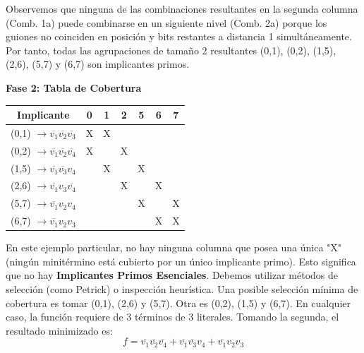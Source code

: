 Observemos que ninguna de las combinaciones resultantes en la segunda columna (Comb. 1a) puede combinarse en un siguiente nivel (Comb. 2a) porque los guiones no coinciden en posición y bits restantes a distancia 1 simultáneamente. Por tanto, todas las agrupaciones de tamaño 2 resultantes (0,1), (0,2), (1,5), (2,6), (5,7) y (6,7) son implicantes primos.

\textbf{Fase 2: Tabla de Cobertura}
\begin{center}
\begin{tabular}{|c|c|c|c|c|c|c|}
\hline
\textbf{Implicante} & \textbf{0} & \textbf{1} & \textbf{2} & \textbf{5} & \textbf{6} & \textbf{7} \\ \hline
(0,1) $\rightarrow \overline{v_1}\overline{v_2}\overline{v_3}$ & X & X & & & & \\ \hline
(0,2) $\rightarrow \overline{v_1}\overline{v_2}\overline{v_4}$ & X & & X & & & \\ \hline
(1,5) $\rightarrow \overline{v_1}\overline{v_3}v_4$ & & X & & X & & \\ \hline
(2,6) $\rightarrow \overline{v_1}v_3\overline{v_4}$ & & & X & & X & \\ \hline
(5,7) $\rightarrow \overline{v_1}v_2v_4$ & & & & X & & X \\ \hline
(6,7) $\rightarrow \overline{v_1}v_2v_3$ & & & & & X & X \\ \hline
\end{tabular}
\end{center}
En este ejemplo particular, no hay ninguna columna que posea una única "X" (ningún minitérmino está cubierto por un único implicante primo). Esto significa que no hay \textbf{Implicantes Primos Esenciales}. Debemos utilizar métodos de selección (como Petrick) o inspección heurística. Una posible selección mínima de cobertura es tomar (0,1), (2,6) y (5,7). Otra es (0,2), (1,5) y (6,7). En cualquier caso, la función requiere de 3 términos de 3 literales. Tomando la segunda, el resultado minimizado es:
\[ f = \overline{v_1}\overline{v_2}\overline{v_4} + \overline{v_1}\overline{v_3}v_4 + \overline{v_1}v_2v_3 \]
